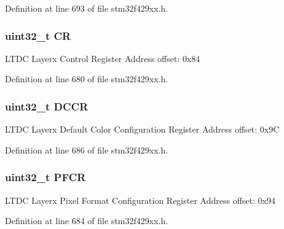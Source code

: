 Definition at line 693 of file stm32f429xx.\+h.

\subsubsection[{\texorpdfstring{CR}{CR}}]{ uint32\+\_\+t CR}\hypertarget{struct_l_t_d_c___layer___type_def_ab40c89c59391aaa9d9a8ec011dd0907a}{}\label{struct_l_t_d_c___layer___type_def_ab40c89c59391aaa9d9a8ec011dd0907a}
L\+T\+DC Layerx Control Register Address offset\+: 0x84 

Definition at line 680 of file stm32f429xx.\+h.

\subsubsection[{\texorpdfstring{D\+C\+CR}{DCCR}}]{ uint32\+\_\+t D\+C\+CR}\hypertarget{struct_l_t_d_c___layer___type_def_a8aa219e1455869d3baf87a618586838d}{}\label{struct_l_t_d_c___layer___type_def_a8aa219e1455869d3baf87a618586838d}
L\+T\+DC Layerx Default Color Configuration Register Address offset\+: 0x9C 

Definition at line 686 of file stm32f429xx.\+h.

\subsubsection[{\texorpdfstring{P\+F\+CR}{PFCR}}]{ uint32\+\_\+t P\+F\+CR}\hypertarget{struct_l_t_d_c___layer___type_def_a30f057fd86f8f793b6ab74bbe024b9d8}{}\label{struct_l_t_d_c___layer___type_def_a30f057fd86f8f793b6ab74bbe024b9d8}
L\+T\+DC Layerx Pixel Format Configuration Register Address offset\+: 0x94 

Definition at line 684 of file stm32f429xx.\+h.

